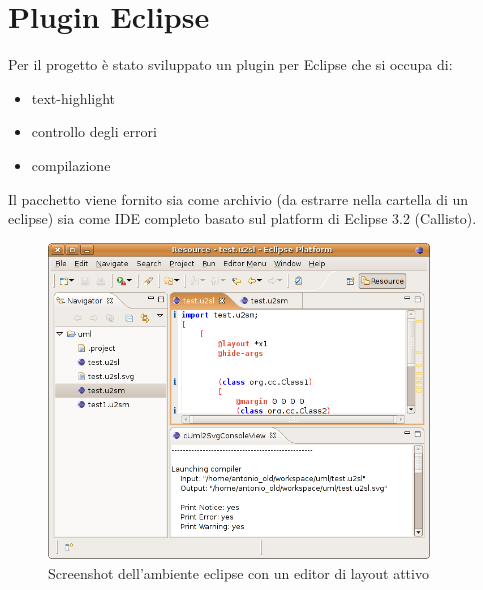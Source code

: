 \section{Plugin Eclipse}

Per il progetto è stato sviluppato un plugin per Eclipse che si occupa di:
\begin{itemize}
  \item text-highlight
  \item controllo degli errori
  \item compilazione
\end{itemize} 

Il pacchetto viene fornito sia come archivio (da estrarre nella cartella di un
eclipse) sia come IDE completo basato sul platform di Eclipse 3.2 (Callisto).

\begin{figure}[htp]
\begin{center}
  \includegraphics[width=0.9\textwidth]{img/eclipse}
  \caption[labelInTOC]{Screenshot dell'ambiente eclipse con un editor di layout
  attivo}
  \label{errorieditor} 
\end{center}
\end{figure}



